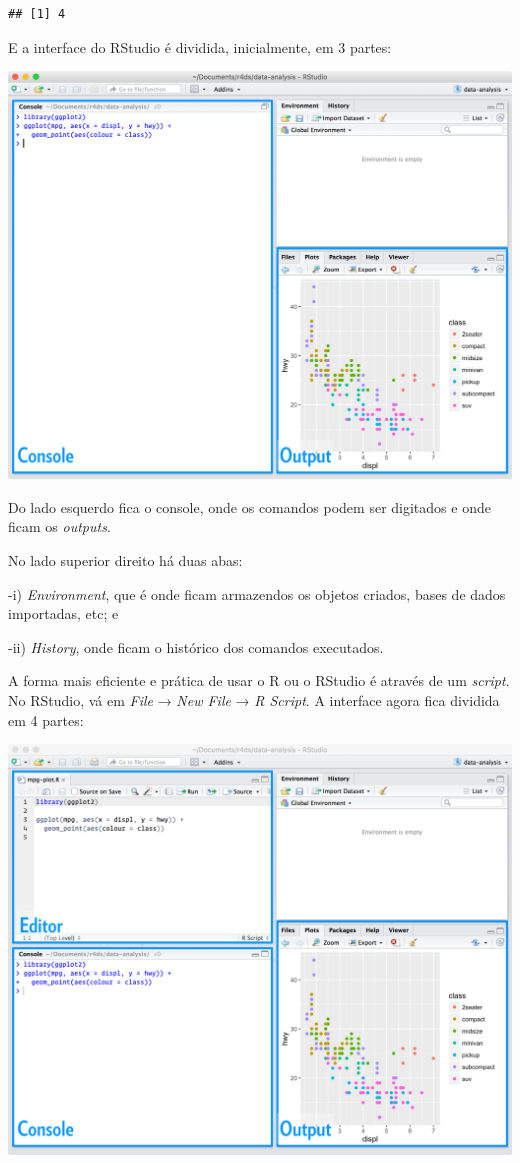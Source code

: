 \documentclass[]{book}
\begin{document}
\begin{verbatim}
## [1] 4
\end{verbatim}

E a interface do RStudio é dividida, inicialmente, em 3 partes:

\begin{center}\includegraphics[width=0.9\linewidth]{imagens/rstudio-console} \end{center}

Do lado esquerdo fica o console, onde os comandos podem ser digitados e onde ficam os \emph{outputs}.

No lado superior direito há duas abas:

-i) \emph{Environment}, que é onde ficam armazendos os objetos criados, bases de dados importadas, etc; e

-ii) \emph{History}, onde ficam o histórico dos comandos executados.

A forma mais eficiente e prática de usar o R ou o RStudio é através de um \emph{script}. No RStudio, vá em \emph{File} → \emph{New File} → \emph{R Script}. A interface agora fica dividida em 4 partes:

\begin{center}\includegraphics[width=0.9\linewidth]{imagens/rstudio-editor} \end{center}
\end{document}
